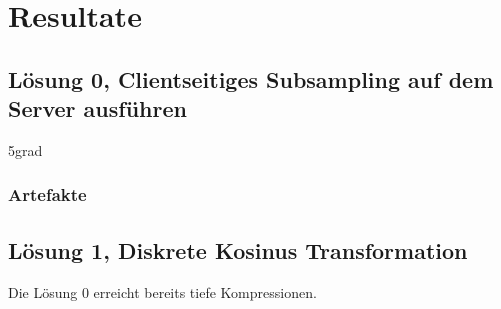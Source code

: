 \section{Resultate}

\subsection{Lösung 0, Clientseitiges Subsampling auf dem Server ausführen }
5grad
\subsubsection{Artefakte}

\subsection{Lösung 1, Diskrete Kosinus Transformation}
Die Lösung 0 erreicht bereits tiefe Kompressionen. 

